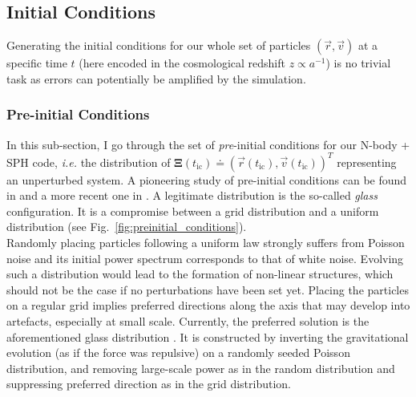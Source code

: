 \vspace*{1.5pc}


\subsection{Initial Conditions}

Generating the initial conditions for our whole set of particles $\left( \vec{r}, \vec{v} \right)$ at a specific time $t$ (here encoded in the cosmological redshift $z \propto a^{-1}$) is no trivial task as errors can potentially be amplified by the simulation. 


\subsubsection{Pre-initial Conditions}
\label{sec:glass}

In this sub-section, I go through the set of \emph{pre}-initial conditions for our N-body + SPH code, \textit{i.e.} the distribution of $\pmb{\Xi}(t_{\mathrm{ic}}) \doteq \left( \vec{r}(t_{\mathrm{ic}}), \vec{v}(t_{\mathrm{ic}}) \right)^T$ representing an unperturbed system. A pioneering study of pre-initial conditions can be found in \citet{White1994} and a more recent one in \citet{LHuillier2014}. A legitimate distribution is the so-called \emph{glass} configuration. It is a compromise between a grid distribution and a uniform distribution (see Fig.~\ref{fig:preinitial_conditions}). \\


Randomly placing particles following a uniform law strongly suffers from Poisson noise and its initial power spectrum corresponds to that of white noise. Evolving such a distribution would lead to the formation of non-linear structures, which should not be the case if no perturbations have been set yet. Placing the particles on a regular grid implies preferred directions along the axis that may develop into artefacts, especially at small scale. Currently, the preferred solution is the aforementioned glass distribution \citep{White1994}. It is constructed by inverting the gravitational evolution (as if the force was repulsive) on a randomly seeded Poisson distribution, and removing large-scale power as in the random distribution and suppressing preferred direction as in the grid distribution. 
	
